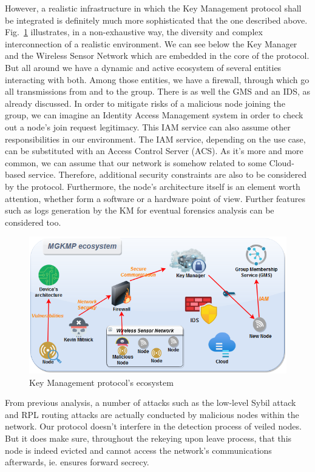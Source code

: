 However, a realistic infrastructure in which the Key Management protocol shall be integrated is definitely much more sophisticated that the one described above. Fig.~\ref{fig:ecosystem} illustrates, in a non-exhaustive way, the diversity and complex interconnection of a realistic environment. We can see below the Key Manager and the Wireless Sensor Network which are embedded in the core of the protocol. But all around we have a dynamic and active ecosystem of several entities interacting with both. Among those entities, we have a firewall, through which go all transmissions from and to the group. There is as well the GMS and an IDS, as already discussed. In order to mitigate risks of a malicious node joining the group, we can imagine an Identity Access Management system in order to check out a node’s join request legitimacy. This IAM service can also assume other responsibilities in our environment. The IAM service, depending on the use case, can be substituted with an Access Control Server (ACS). As it’s more and more common, we can assume that our network is somehow related to some Cloud-based service. Therefore, additional security constraints are also to be considered by the protocol. Furthermore, the node’s architecture itself is an element worth attention, whether form a software or a hardware point of view. Further features such as logs generation by the KM for eventual forensics analysis can be considered too.

\begin{figure}[htbp]
	\centerline{\includegraphics[scale=0.60]{figures/mgkmp/ecosystem.png}}
	\caption{Key Management protocol's ecosystem}
	\label{fig:ecosystem}
\end{figure}

From previous analysis, a number of attacks such as the low-level Sybil attack and RPL routing attacks are actually conducted by malicious nodes within the network. Our protocol doesn’t interfere in the detection process of veiled nodes. But it does make sure, throughout the rekeying upon leave process, that this node is indeed evicted and cannot access the network’s communications afterwards, ie. ensures forward secrecy.


